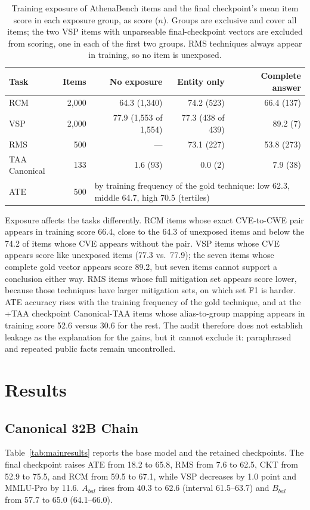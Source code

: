 \documentclass[conference]{IEEEtran}
\begin{document}
\begin{table}[t]
\caption{Training exposure of AthenaBench items and the final checkpoint's mean item score in each exposure group, as score ($n$). Groups are exclusive and cover all items; the two VSP items with unparseable final-checkpoint vectors are excluded from scoring, one in each of the first two groups. RMS techniques always appear in training, so no item is unexposed.}
\label{tab:overlap}
\centering
\footnotesize
\setlength{\tabcolsep}{4.0pt}
\begin{tabular}{@{}lrrrr@{}}
\toprule
Task & Items & No exposure & Entity only & Complete answer \\
\midrule
RCM & 2,000 & 64.3 (1,340) & 74.2 (523) & 66.4 (137) \\
VSP & 2,000 & 77.9 (1,553 of 1,554) & 77.3 (438 of 439) & 89.2 (7) \\
RMS & 500 & --- & 73.1 (227) & 53.8 (273) \\
TAA Canonical & 133 & 1.6 (93) & 0.0 (2) & 7.9 (38) \\
ATE & 500 & \multicolumn{3}{l}{by training frequency of the gold technique: low 62.3, middle 64.7, high 70.5 (tertiles)} \\
\bottomrule
\end{tabular}
\end{table}

Exposure affects the tasks differently. RCM items whose exact CVE-to-CWE pair appears in training score 66.4, close to the 64.3 of unexposed items and below the 74.2 of items whose CVE appears without the pair. VSP items whose CVE appears score like unexposed items (77.3 vs.\ 77.9); the seven items whose complete gold vector appears score 89.2, but seven items cannot support a conclusion either way. RMS items whose full mitigation set appears score lower, because those techniques have larger mitigation sets, on which set F1 is harder. ATE accuracy rises with the training frequency of the gold technique, and at the +TAA checkpoint Canonical-TAA items whose alias-to-group mapping appears in training score 52.6 versus 30.6 for the rest. The audit therefore does not establish leakage as the explanation for the gains, but it cannot exclude it: paraphrased and repeated public facts remain uncontrolled.

\section{Results}\label{sec:results}
\subsection{Canonical 32B Chain}
Table~\ref{tab:mainresults} reports the base model and the retained checkpoints. The final checkpoint raises ATE from 18.2 to 65.8, RMS from 7.6 to 62.5, CKT from 52.9 to 75.5, and RCM from 59.5 to 67.1, while VSP decreases by 1.0 point and MMLU-Pro by 11.6. $A_{bal}$ rises from 40.3 to 62.6 (interval 61.5--63.7) and $B_{bal}$ from 57.7 to 65.0 (64.1--66.0).
\end{document}
